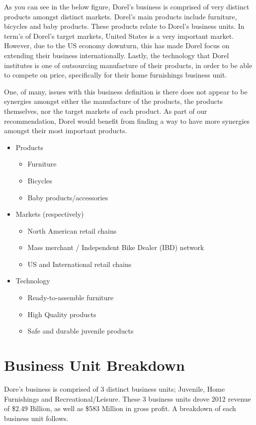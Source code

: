 As you can see in the below figure, Dorel’s business is comprised of very distinct products amongst distinct markets. Dorel’s main products include furniture, bicycles and baby products.  These products relate to Dorel’s business units.   In term’s of Dorel’s target markets, United States is a very important market. However, due to the US economy downturn, this has made Dorel focus on extending their business internationally.  Lastly, the technology that Dorel institutes is one of outsourcing manufacture of their products, in order to be able to compete on price, specifically for their home furnishings business unit.

One, of many, issues with this business definition is there does not appear to be synergies amongst either the manufacture of the products, the products themselves, nor the target markets of each product. As part of our recommendation, Dorel would benefit from finding a way to have more synergies amongst their most important products. 

\begin{itemize}        	
  \item Products
    \begin{itemize}
      \item Furniture
      \item Bicycles
      \item Baby products/accessories
    \end{itemize}
  \item Markets (respectively)
    \begin{itemize}     
      \item North American retail chains
      \item Mass merchant / Independent Bike Dealer (IBD) network
      \item US and International retail chains
    \end{itemize}
  \item Technology
    \begin{itemize}     
      \item Ready-to-assemble furniture
      \item High Quality products
      \item Safe and durable juvenile products
    \end{itemize}
\end{itemize}


\section{Business Unit Breakdown}
Dore’s business is comprised of 3 distinct business units; Juvenile, Home Furnishings and Recreational/Leisure.  These 3 business units drove 2012 revenue of \$2.49 Billion, as well as \$583 Million in gross profit. A breakdown of each business unit follows.


